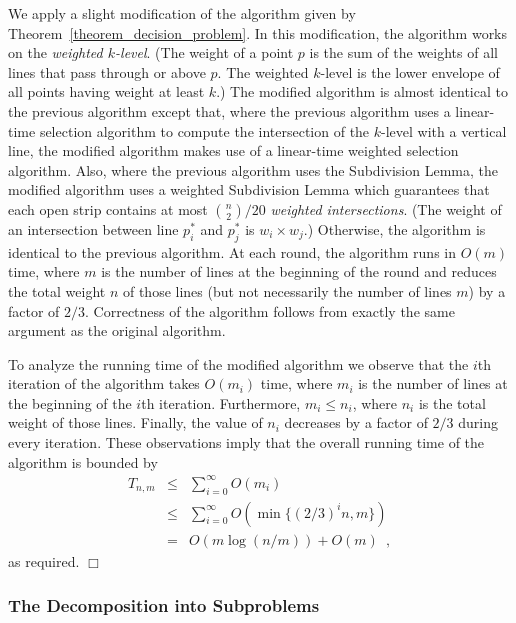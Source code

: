 \documentclass{elsart}
\newenvironment{proof}{{\bf Proof:} \rm}{\hfill $\Box$ \medskip\\}
\begin{document}
\begin{proof} We apply a slight modification of the algorithm given by
Theorem~\ref{theorem_decision_problem}.  In this modification, the
algorithm works on the \emph{weighted $k$-level}.  (The weight of a
point $p$ is the sum of the weights of all lines that pass through or
above $p$. The weighted $k$-level is the lower envelope of all points
having weight at least $k$.)  The modified algorithm is almost
identical to the previous algorithm except that, where the previous
algorithm uses a linear-time selection algorithm to compute the
intersection of the $k$-level with a vertical line, the modified
algorithm makes use of a linear-time weighted selection algorithm.
Also, where the previous algorithm uses the Subdivision Lemma, the
modified algorithm uses a weighted Subdivision Lemma which guarantees
that each open strip contains at most ${n\choose 2}/20$ \emph{weighted
intersections}.  (The weight of an intersection between line $p_i^*$
and $p_j^*$ is $w_i\times w_j$.) Otherwise, the algorithm is identical
to the previous algorithm.  At each round, the algorithm runs in
$O(m)$ time, where $m$ is the number of lines at the beginning of the
round and reduces the total weight $n$ of those lines (but not
necessarily the number of lines $m$) by a factor of $2/3$.
Correctness of the algorithm follows from exactly the same argument as
the original algorithm.

To analyze the running time of the modified algorithm we observe that the
$i$th iteration of the algorithm takes $O(m_i)$ time, where $m_i$ is
the number of lines at the beginning of the $i$th iteration.
Furthermore, $m_i\le n_i$, where $n_i$ is the total weight of those
lines. Finally, the value of $n_i$ decreases by a factor of $2/3$
during every iteration. These observations imply that the overall
running time of the algorithm is bounded by 
\begin{eqnarray*} 
  T_{n,m}
    & \le & \sum_{i=0}^{\infty} O(m_i) \\ 
    &\le& \sum_{i=0}^{\infty} O(\min\{(2/3)^in, m\})  \\ 
    & = & O(m\log (n/m)) + O(m) \enspace ,
\end{eqnarray*} 
as required.  
\end{proof}

\subsubsection{The Decomposition into
Subproblems}\label{section_decomp}
\end{document}
